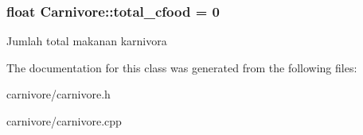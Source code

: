 \subsubsection[{\texorpdfstring{total\+\_\+cfood}{total_cfood}}]{\setlength{\rightskip}{0pt plus 5cm}float Carnivore\+::total\+\_\+cfood = 0\hspace{0.3cm}{\ttfamily [static]}}\hypertarget{classCarnivore_ab449b336745a74e84784bfc13489ec15}{}\label{classCarnivore_ab449b336745a74e84784bfc13489ec15}
Jumlah total makanan karnivora 

The documentation for this class was generated from the following files\+:\begin{DoxyCompactItemize}
\item 
carnivore/carnivore.\+h\item 
carnivore/carnivore.\+cpp\end{DoxyCompactItemize}
